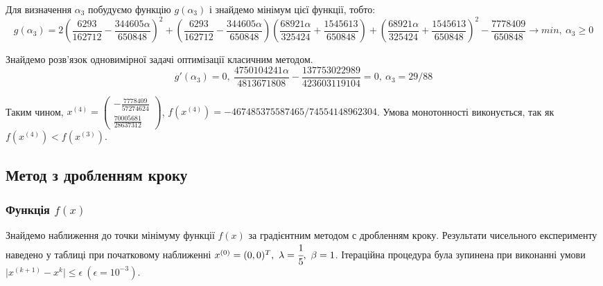 \documentclass[14pt,a4paper]{extarticle}
\theoremstyle{definition}
\renewcommand{\[}{\begin{dmath*}[compact]}
\renewcommand{\]}{\end{dmath*}}
\newcommand{\sep}{ , \ \allowbreak }
\begin{document}
Для визначення $\alpha_3$ побудуємо функцію $g(\alpha_3)$ і знайдемо мінімум цієї функції, тобто:
\[g(\alpha_3)=2 \left(\frac{6293}{162712} - \frac{344605 \alpha}{650848}\right)^{2} + \left(\frac{6293}{162712} - \frac{344605 \alpha}{650848}\right) \left(\frac{68921 \alpha}{325424} + \frac{1545613}{650848}\right) + \left(\frac{68921 \alpha}{325424} + \frac{1545613}{650848}\right)^{2} - \frac{7778409}{650848} \to min \sep \alpha_3 \geq 0\]

Знайдемо розв'язок одновимірної задачі оптимізації класичним методом.
\[g'(\alpha_3)=0 \sep \frac{4750104241 \alpha}{4813671808} - \frac{137753022989}{423603119104}=0 \sep \alpha_3=29/88\]

Таким чином, $x^{(4)} = \left(\begin{matrix}- \frac{7778409}{57274624}\\\frac{70005681}{28637312}\end{matrix}\right)$, $f(x^{(4)})=-467485375587465/74554148962304$.
Умова монотонності виконується, так як $f(x^{(4)})<f(x^{(3)})$.
\subsection{Метод з дробленням кроку}

\subsubsection{Функція $f(x)$}

Знайдемо наближення до точки мінімуму функції $f(x)$ за градієнтним методом с дробленням кроку.
Результати чисельного експерименту наведено у таблиці при початковому наближенні $x^{(0)}=(0,0)^T \sep \lambda = \cfrac15 \sep \beta = 1$.
Ітераційна процедура була зупинена при виконанні умови $\vert x^{(k+1)} - x^{k}\vert \leq \epsilon \ (\epsilon = 10^{-3})$.
\end{document}
